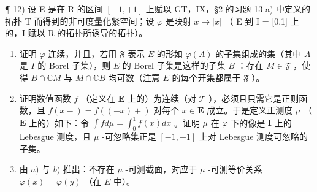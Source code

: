 ¶ 12) 设 E 是在 R 的区间 \([-1,+1]\) 上赋以 GT，IX，§2 的习题 13 a) 中定义的拓扑 T 而得到的非可度量化紧空间；设 \(\varphi\) 是映射 \(x \mapsto |x|\) （ E 到 I = {[}0,1{]} 上的，I 赋以 R 的拓扑所诱导的拓扑）。

\begin{enumerate}
\def\labelenumi{\alph{enumi})}
\item
  证明 \(\varphi\) 连续，并且，若用 \(\mathfrak{F}\) 表示 \(E\) 的形如 \(\overline{\varphi}(A)\) 的子集组成的集（其中 \(A\) 是 \(I\) 的 Borel 子集），则 \(E\) 的 Borel 子集是这样的子集 \(B\) ：存在 \(M \in \mathfrak{F}\) ，使得 \(B \cap \mathbb{C}M\) 与 \(M \cap \mathbb{C}B\) 均可数（注意 \(E\) 的每个开集都属于 \(\mathfrak{F}\) ）。
\item
  证明数值函数 \(f\) （定义在 \(\mathbf{E}\) 上的）为连续（对 \(\mathcal{T}\) ），必须且只需它是正则函数，且 \(f(x-) = f((-x)+)\) 对每个 \(x \in \mathbf{E}\) 成立。于是定义正测度 \(\mu\) （ \(\mathbf{E}\) 上的）如下：令 \(\int f d\mu = \int_0^1 f(x) dx\) 。证明 \(\mu\) 在 \(\varphi\) 下的像是 \(\mathbf{I}\) 上的 Lebesgue 测度，且 \(\mu\) -可忽略集正是 \([-1, +1]\) 上对 Lebesgue 测度可忽略的子集。
\item
  由 \(a)\) 与 \(b)\) 推出：不存在 \(\mu\) -可测截面，对应于 \(\mu\) -可测等价关系 \(\varphi(x) = \varphi(y)\) （在 \(E\) 中）。
\end{enumerate}

